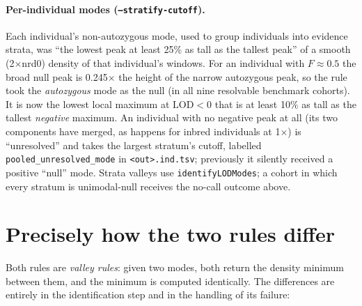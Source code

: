 \documentclass[11pt]{article}
\newcommand{\lod}{\mathrm{LOD}}
\newcommand{\code}[1]{\texttt{#1}}
\begin{document}
\paragraph{Per-individual modes (\code{--stratify-cutoff}).} Each individual's non-autozygous mode, used to group individuals into evidence strata, was ``the lowest peak at least 25\% as tall as the tallest peak'' of a smooth (2$\times$nrd0) density of that individual's windows. For an individual with $F\approx0.5$ the broad null peak is 0.245$\times$ the height of the narrow autozygous peak, so the rule took the \emph{autozygous} mode as the null (in all nine resolvable benchmark cohorts). It is now the lowest local maximum at $\lod<0$ that is at least 10\% as tall as the tallest \emph{negative} maximum. An individual with no negative peak at all (its two components have merged, as happens for inbred individuals at 1$\times$) is ``unresolved'' and takes the largest stratum's cutoff, labelled \code{pooled\_unresolved\_mode} in \code{<out>.ind.tsv}; previously it silently received a positive ``null'' mode. Strata valleys use \code{identifyLODModes}; a cohort in which every stratum is unimodal-null receives the no-call outcome above.

\section{Precisely how the two rules differ}
\label{sec:diff}

Both rules are \emph{valley rules}: given two modes, both return the density minimum between them, and the minimum is computed identically. The differences are entirely in the identification step and in the handling of its failure:
\end{document}
